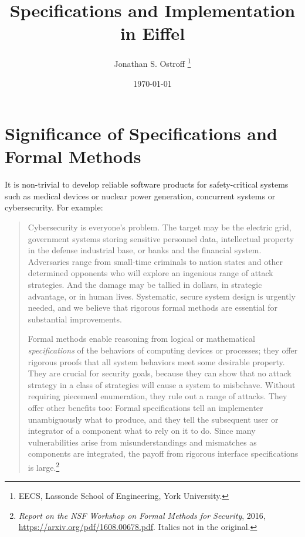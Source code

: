 \documentclass[runningheads,12pt]{article}
\begin{document}
\title{Specifications and Implementation in Eiffel}
\author{Jonathan S. Ostroff \thanks{EECS, Lassonde School of Engineering, York University.}}
\date{\today}

\maketitle
\tableofcontents
\newpage

\section{Significance of Specifications and Formal Methods}
It is non-trivial to develop reliable software products for safety-critical systems such as medical devices or nuclear power generation, concurrent systems or cybersecurity. For example:

\begin{quote}
Cybersecurity is everyone’s problem. The target may be the electric grid, government systems storing sensitive personnel data, intellectual property in the defense industrial base, or banks and the financial system. Adversaries range from small-time criminals to nation states and other determined opponents who will explore an ingenious range of attack strategies. And the damage may be tallied in dollars, in strategic advantage, or in human lives. Systematic, secure system design is urgently needed, and we believe that rigorous formal methods are essential for substantial improvements.

Formal methods enable reasoning from logical or mathematical \textit{specifications} of the behaviors of computing devices or processes; they offer rigorous proofs that all system behaviors meet some desirable property. They are crucial for security goals, because they can show that no attack strategy in a class of strategies will cause a system to misbehave. Without requiring piecemeal enumeration, they rule out a range of attacks. They offer other benefits too: Formal specifications tell an implementer unambiguously what to produce, and they tell the subsequent user or integrator of a component what to rely on it to do. Since many vulnerabilities arise from misunderstandings and mismatches as components are integrated, the payoff from rigorous interface specifications is large.\footnote{%
\textit{Report on the NSF Workshop on Formal Methods for Security}, 2016, \url{https://arxiv.org/pdf/1608.00678.pdf}. Italics not in the original.}
\end{quote}
\end{document}
